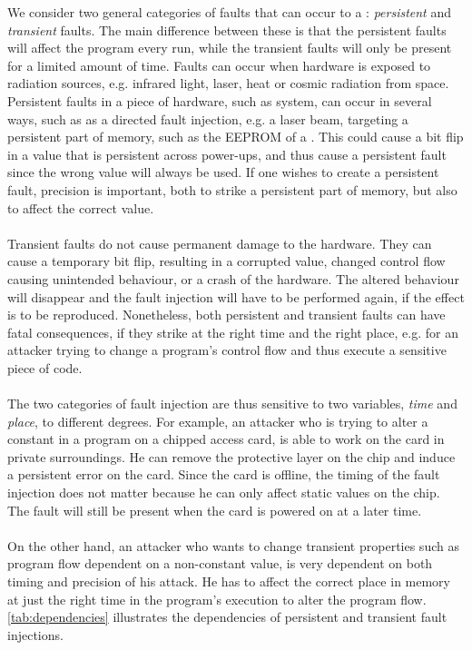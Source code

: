 We consider two general categories of faults that can occur to a \jc: \textit{persistent} and \textit{transient} faults. The main difference between these is that the persistent faults will affect the program every run, while the transient faults will only be present for a limited amount of time. Faults can occur when hardware is exposed to radiation sources, e.g. infrared light, laser, heat or cosmic radiation from space. 
Persistent faults in a piece of hardware, such as system, can occur in several ways, such as as a directed fault injection, e.g. a laser beam, targeting a persistent part of memory, such as the EEPROM of a \jc. This could cause a bit flip in a value that is persistent across power-ups, and thus cause a persistent fault since the wrong value will always be used. If one wishes to create a persistent fault, precision is important, both to strike a persistent part of memory, but also to affect the correct value.\\\\
Transient faults do not cause permanent damage to the hardware. They can cause a temporary bit flip, resulting in a corrupted value, changed control flow causing unintended behaviour, or a crash of the hardware. The altered behaviour will disappear and the fault injection will have to be performed again, if the effect is to be reproduced.
Nonetheless, both persistent and transient faults can have fatal consequences, if they strike at the right time and the right place, e.g. for an attacker trying to change a program's control flow and thus execute a sensitive piece of code.\\\\
The two categories of fault injection are thus sensitive to two variables, \textit{time} and \textit{place}, to different degrees. For example, an attacker who is trying to alter a constant in a program on a chipped access card, is able to work on the card in private surroundings. He can remove the protective layer on the chip and induce a persistent error on the card. Since the card is offline, the timing of the fault injection does not matter because he can only affect static values on the chip. The fault will still be present when the card is powered on at a later time.\\\\
On the other hand, an attacker who wants to change transient properties such as program flow dependent on a non-constant value, is very dependent on both timing and precision of his attack. He has to affect the correct place in memory at just the right time in the program's execution to alter the program flow. \cref{tab:dependencies} illustrates the dependencies of persistent and transient fault injections.

